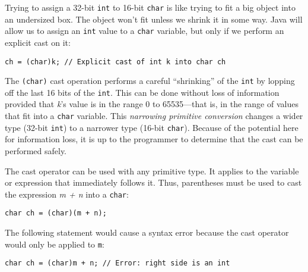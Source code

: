 \noindent Trying to assign a 32-bit {\tt int} to
16-bit {\tt char} is like trying to fit a big object into an
undersized box.  The object won't fit unless we shrink it in some way.
Java will allow us to assign an {\tt int} value to a {\tt char}
variable, but only if we perform an explicit cast on it:


\begin{jjjlisting}
\begin{lstlisting}
ch = (char)k; // Explicit cast of int k into char ch
\end{lstlisting}
\end{jjjlisting}

\noindent The {\tt (char)} cast operation performs a careful ``shrinking''
of the {\tt int} by lopping off the last 16 bits of the {\tt int}.
This can be done without loss of information provided that {\it k}'s value
is in the range 0 to 65535---that is, in the range of values that fit into
a {\tt char} variable.  This {\it narrowing primitive conversion}
changes a wider type (32-bit {\tt int}) to a narrower type (16\mbox{-}bit
{\tt char}).  Because of the potential here for information loss, it is up
to the programmer to determine that the cast can be performed safely.


\noindent The cast operator can be used with any primitive type. It applies to
the variable or expression that immediately follows it. Thus,
parentheses must be used to cast the expression {\it m + n} into a
{\tt char}:

\begin{jjjlisting}
\begin{lstlisting}
char ch = (char)(m + n);
\end{lstlisting}
\end{jjjlisting}

\noindent The following statement would cause a syntax error because
the cast operator would only be applied to {\tt m}:

\begin{jjjlisting}
\begin{lstlisting}
char ch = (char)m + n; // Error: right side is an int
\end{lstlisting}
\end{jjjlisting}


